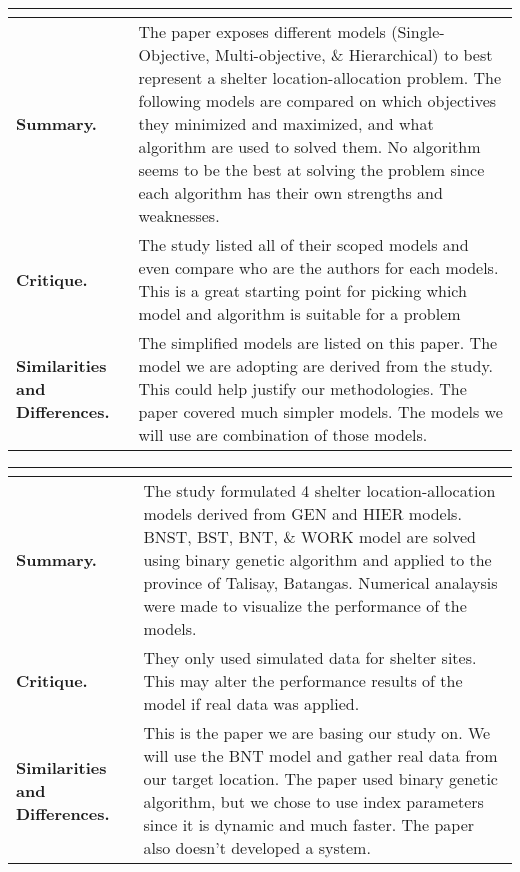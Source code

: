 \begin{longtable}{|L{.2\linewidth}|L{.74\linewidth}|}
	\\ \hline
	\textbf{Summary.} & The paper exposes different models (Single-Objective, Multi-objective, \& Hierarchical) to best represent a shelter location-allocation problem. The following models are compared on which objectives they minimized and maximized, and what algorithm are used to solved them. No algorithm seems to be the best at solving the problem since each algorithm has their own strengths and weaknesses.\\ \hline
	\textbf{Critique.} & The study listed all of their scoped models and even compare who are the authors for each models. This is a great starting point for picking which model and algorithm is suitable for a problem\\ \hline
	\textbf{Similarities and Differences.} & The simplified models are listed on this paper. The model we are adopting are derived from the study. This could help justify our methodologies.	The paper covered much simpler models. The models we will use are combination of those models.\\ \hline
\end{longtable}

\begin{longtable}{|L{.2\linewidth}|L{.74\linewidth}|}
	\hline
	\\ \hline
	\textbf{Summary.} & The study formulated 4 shelter location-allocation models derived from GEN and HIER models. BNST, BST, BNT, \& WORK model are solved using binary genetic algorithm and applied to the province of Talisay, Batangas. Numerical analaysis were made to visualize the performance of the models.\\ \hline
	\textbf{Critique.} & They only used simulated data for shelter sites. This may alter the performance results of the model if real data was applied.\\ \hline
	\textbf{Similarities and Differences.} & This is the paper we are basing our study on. We will use the BNT model and gather real data from our target location.	The paper used binary genetic algorithm, but we chose to use index parameters since it is dynamic and much faster. The paper also doesn't developed a system.\\ \hline
\end{longtable}

